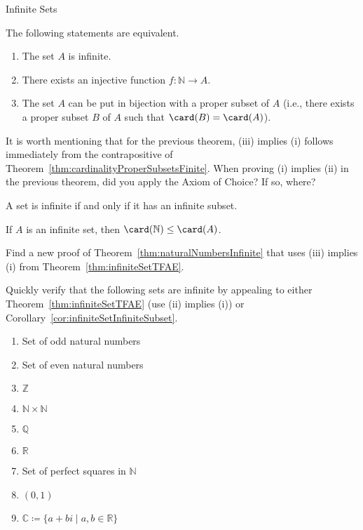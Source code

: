 \begin{section}{Infinite Sets}
\begin{theorem}\label{thm:infiniteSetTFAE}
The following statements are equivalent.
\begin{enumerate}[label=\textrm{(\roman*)}]
\item The set $A$ is infinite.
\item There exists an injective function $f:\mathbb{N}\to A$.
\item The set $A$ can be put in bijection with a proper subset of $A$ (i.e., there exists a proper subset $B$ of $A$ such that $\card(B)=\card(A)$).
\end{enumerate}
\end{theorem}

It is worth mentioning that for the previous theorem, (iii) implies (i) follows immediately from the contrapositive of Theorem~\ref{thm:cardinalityProperSubsetsFinite}. When proving (i) implies (ii) in the previous theorem, did you apply the Axiom of Choice?  If so, where? 

\begin{corollary}\label{cor:infiniteSetInfiniteSubset}
A set is infinite if and only if it has an infinite subset.
\end{corollary}

\begin{corollary}
If $A$ is an infinite set, then $\card(\mathbb{N})\leq \card(A)$.
\end{corollary}

\begin{problem}
Find a new proof of Theorem~\ref{thm:naturalNumbersInfinite} that uses (iii) implies (i) from Theorem~\ref{thm:infiniteSetTFAE}.
\end{problem}

\begin{problem}\label{prob:moreInfiniteSets}
Quickly verify that the following sets are infinite by appealing to either Theorem~\ref{thm:infiniteSetTFAE} (use (ii) implies (i)) or Corollary~\ref{cor:infiniteSetInfiniteSubset}.
\begin{enumerate}[label=\textrm{(\alph*)}]
\item Set of odd natural numbers
\item Set of even natural numbers
\item $\mathbb{Z}$
\item $\mathbb{N}\times \mathbb{N}$
\item $\mathbb{Q}$
\item $\mathbb{R}$
\item Set of perfect squares in $\mathbb{N}$
\item $(0,1)$
\item $\mathbb{C}\coloneqq \{a+bi\mid a,b\in\mathbb{R}\}$
\end{enumerate}
\end{problem}

\end{section}